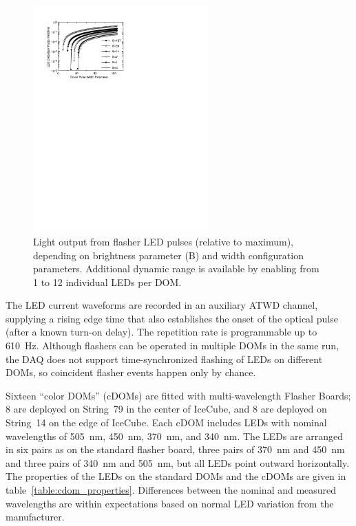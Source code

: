 \begin{figure}[h]
 \centering
 \includegraphics[width=0.6\textwidth]{graphics/dom/functional/domfig5-BrightnessModel.pdf}
 \caption{Light output from flasher LED pulses (relative to maximum), depending
on brightness parameter (B) and width configuration parameters.  Additional dynamic range is available
by enabling from 1 to 12 individual LEDs per DOM.}
 \label{fig:flasheroutput}
\end{figure}

The LED current waveforms are recorded in an auxiliary ATWD channel, supplying
a rising edge time that also establishes the onset of the optical pulse (after a known
turn-on delay).
The repetition rate is programmable up to \qty{610}{Hz}.
Although flashers can be
operated in multiple DOMs in the same run, the DAQ does not support
time-synchronized flashing of LEDs on different DOMs, so coincident flasher
events happen only by chance. 

Sixteen ``color DOMs'' (cDOMs) are fitted with multi-wavelength
Flasher Boards; 8 are deployed on String~79 in the center of IceCube, and 8
are deployed on String~14 on the edge of IceCube.  Each
cDOM includes LEDs with nominal wavelengths of 505~nm, 450~nm, 370~nm,
and 340~nm. The LEDs are arranged in six pairs as on the
standard flasher board, three pairs of 370~nm and 450~nm and three
pairs of 340~nm and 505~nm, but all LEDs point outward horizontally. 
The properties of the LEDs on the standard DOMs and the cDOMs are
given in table~\ref{table:cdom_properties}. Differences between the nominal and
measured wavelengths are within expectations based on normal LED
variation from the manufacturer.

